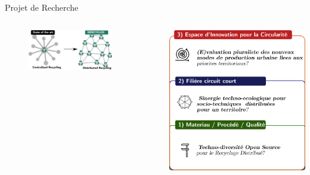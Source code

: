 \documentclass[
  11pt,
  ignorenonframetext,
  aspectratio=169,
  c]{beamer}
\begin{document}
\begin{frame}[t]{Projet de Recherche}
\begin{columns}[T]
\begin{column}{0.6\textwidth}
\begin{figure}

{\centering \includegraphics[width=0.8\textwidth,height=\textheight]{Figures/slides/ERC.png}

}

\end{figure}
\end{column}

\begin{column}{0.4\textwidth}
\includegraphics{Figures/slides/Projet-ERPI.png}
\end{column}
\end{columns}


\end{frame}
\end{document}
